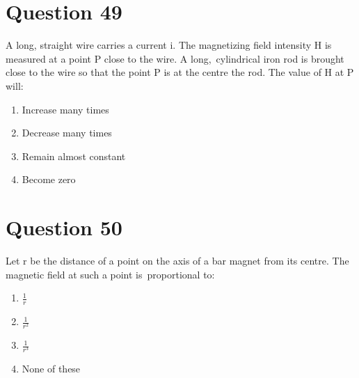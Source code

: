 \documentclass{article}
\begin{document}
\section*{Question 49}
A long, straight wire carries a current i. The magnetizing field intensity H is measured at a point P close to the wire. A long, cylindrical iron rod is brought close to the wire so that the point P is at the centre the rod. The value of H at P will:
\begin{enumerate}[label=(\alph*)]
\item Increase many times
\item Decrease many times
\item Remain almost constant
\item Become zero
\end{enumerate}
\newpage
\section*{Question 50}
Let r be the distance of a point on the axis of a bar magnet from its centre. The magnetic field at such a point is proportional to:
\begin{enumerate}[label=(\alph*)]
\item \(\frac{1}{r}\)
\item \(\frac{1}{r^{2}}\)
\item \(\frac{1}{r^{3}}\)
\item None of these
\end{enumerate}
\newpage
\end{document}
